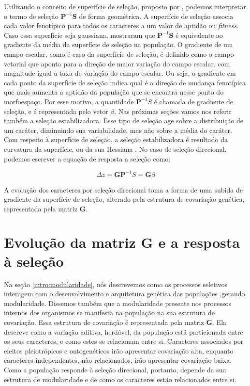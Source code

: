 Utilizando o conceito de superfície de seleção, proposto por
\cite{Wright1932}, podemos interpretar o termo de seleção
$\mathbf{P}^{-1}\mathbf{S}$ de forma geométrica.
A superfície de seleção associa cada valor fenotípico para todos os
caracteres a um valor de aptidão ou {\it fitness}.
Caso essa superfície seja gaussiana, \cite{Lande1983} mostraram que
$\mathbf{P}^{-1}\mathbf{S}$ é equivalente ao gradiente da média da
superfície de seleção na população.
O gradiente de um campo escalar, como é caso da superfície de seleção,
é definido como o campo vetorial que aponta para a direção de maior
variação do campo escalar, com magnitude igual a taxa de variação do
campo escalar.
Ou seja, o gradiente em cada ponto da superfície de seleção indica qual
é a direção de mudança fenotípica que mais aumenta a aptidão da
população que se encontra nesse ponto do morfoespaço.
Por esse motivo, a quantidade $\mathbf{P}^{-1}S$ é chamada
de gradiente de seleção, e é representada pelo vetor $\beta$.
Nas próximas seções vamos nos referir também a seleção estabilizadora.
Esse tipo de seleção age sobre a distribuição de um caráter, diminuindo
sua variabilidade, mas não sobre a média do caráter.
Com respeito à superfície de seleção, a seleção estabilizadora é
resultado da curvatura da superfície, ou da sua Hessiana
\citep{Lande1983}.
No caso de seleção direcional, podemos escrever a equação de resposta a
seleção como:

\begin{equation}
    \Delta z = \mathbf{GP}^{-1}S = \mathbf{G}\beta
\end{equation}

A evolução dos caracteres por seleção direcional toma a forma de uma
subida de gradiente da superfície de seleção, alterado pela estrutura de
covariação genética, representada pela matriz $\mathbf{G}$.

\section{Evolução da matriz $\mathbf{G}$ e a resposta à seleção}\label{intro:matG}

Na seção \ref{intro:modularidade}, nós descrevemos como os processos
seletivos interagem com o desenvolvimento e arquitetura genética das
populações ,gerando modularidade.
Dissemos também que a modularidade presente nos processos internos dos
organismos se manifesta na população na sua estrutura de covariação.
Essa estrutura de covariação é representada pela matriz $\mathbf{G}$.
Ela descreve como a variação aditiva, herdável, da população está particionada entre os
seus caracteres, e como estes se relacionam entre si.
Caracteres associados por efeitos pleiotrópicos e ontogenéticos irão
apresentar covariação alta, enquanto caracteres independentes, não
relacionados, irão apresentar covariação baixa.
Como a população responde à seleção direcional, portanto, depende da sua estrutura
de modularidade e de como os caracteres estão relacionados entre si.

